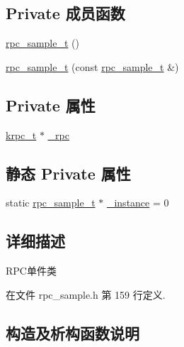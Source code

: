 \subsection*{Private 成员函数}
\begin{DoxyCompactItemize}
\item 
\hyperlink{classrpc__sample_1_1rpc__sample__t_a80e5cd04284d2f0fe09a09632d7b4d05}{rpc\+\_\+sample\+\_\+t} ()
\item 
\hyperlink{classrpc__sample_1_1rpc__sample__t_a12c9f77574aa1d207370194feaa514de}{rpc\+\_\+sample\+\_\+t} (const \hyperlink{classrpc__sample_1_1rpc__sample__t}{rpc\+\_\+sample\+\_\+t} \&)
\end{DoxyCompactItemize}
\subsection*{Private 属性}
\begin{DoxyCompactItemize}
\item 
\hyperlink{config_8h_a1e414ac6f6de24462ccf81e10f63428d}{krpc\+\_\+t} $\ast$ \hyperlink{classrpc__sample_1_1rpc__sample__t_a9e1768d7a6a84aa321a1e51a4b622c2d}{\+\_\+rpc}
\end{DoxyCompactItemize}
\subsection*{静态 Private 属性}
\begin{DoxyCompactItemize}
\item 
static \hyperlink{classrpc__sample_1_1rpc__sample__t}{rpc\+\_\+sample\+\_\+t} $\ast$ \hyperlink{classrpc__sample_1_1rpc__sample__t_ab21a57379ad2184d3f228b9dfca29ad9}{\+\_\+instance} = 0
\end{DoxyCompactItemize}


\subsection{详细描述}
R\+P\+C单件类 

在文件 rpc\+\_\+sample.\+h 第 159 行定义.



\subsection{构造及析构函数说明}
\hypertarget{classrpc__sample_1_1rpc__sample__t_a5fadb73b0293c923802be0585ed0aef7}{}
